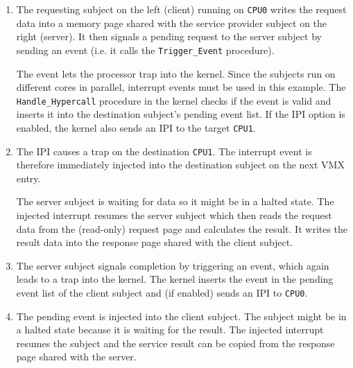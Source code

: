 \begin{enumerate}
	\item The requesting subject on the left (client) running on \texttt{CPU0}
		writes the request data into a memory page shared with the service
		provider subject on the right (server). It then signals a pending
		request to the server subject by sending an event (i.e. it calls the
		\texttt{Trigger\_Event} procedure).

		The event lets the processor trap into the kernel. Since the subjects
		run on different cores in parallel, interrupt events must be used in
		this example. The \texttt{Handle\_Hypercall} procedure in the kernel
		checks if the event is valid and inserts it into the destination
		subject's pending event list. If the IPI option is enabled, the kernel
		also sends an IPI to the target \texttt{CPU1}.
	\item The IPI causes a trap on the destination \texttt{CPU1}. The interrupt
		event is therefore immediately injected into the destination subject on
		the next VMX entry.

		The server subject is waiting for data so it might be in a halted state.
		The injected interrupt resumes the server subject which then reads the
		request data from the (read-only) request page and calculates the
		result. It writes the result data into the response page shared with the
		client subject.
	\item The server subject signals completion by triggering an event, which
		again leads to a trap into the kernel. The kernel inserts the event in
		the pending event list of the client subject and (if enabled) sends an
		IPI to \texttt{CPU0}.
	\item The pending event is injected into the client subject. The subject
		might be in a halted state because it is waiting for the result. The
		injected interrupt resumes the subject and the service result can be
		copied from the response page shared with the server.
\end{enumerate}
